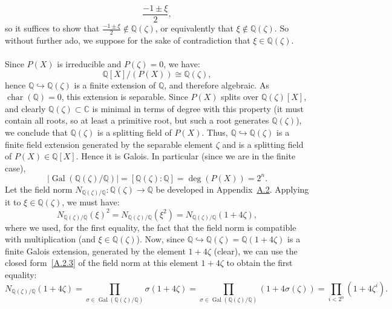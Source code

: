 \documentclass[11pt, a4paper, oneside]{article}
\theoremstyle{remark}
\theoremstyle{lemma}
\begin{document}
\[
\frac{-1 \pm \xi}{2},
\]
so it suffices to show that \( \frac{-1 \pm \xi}{2} \notin \mathbb{Q}(\zeta) \), or equivalently that \( \xi \notin \mathbb{Q}(\zeta) \). So without further ado, we suppose for the sake of contradiction that \( \xi \in \mathbb{Q}(\zeta) \).
\\\\
Since \( P(X) \) is irreducible and \( P(\zeta) = 0 \), we have:
\[
\mathbb{Q}[X] / \left( P(X) \right) \cong \mathbb{Q} \left( \zeta \right),
\]
hence \( \mathbb{Q} \hookrightarrow \mathbb{Q} \left( \zeta \right) \) is a finite extension of \( \mathbb{Q} \), and therefore algebraic. As \( \operatorname{char} \left( \mathbb{Q} \right) = 0 \), this extension is separable. Since \( P(X) \) splits over \( \mathbb{Q} \left( \zeta \right)[X] \), and clearly \( \mathbb{Q} \left( \zeta \right) \subset \mathbb{C} \) is minimal in terms of degree with this property (it must contain all roots, so at least a primitive root, but such a root generates \( \mathbb{Q} \left( \zeta \right) \)), we conclude that \( \mathbb{Q} \left( \zeta \right) \) is a splitting field of \( P(X) \). Thus, \( \mathbb{Q} \hookrightarrow \mathbb{Q} \left( \zeta \right) \) is a finite field extension generated by the separable element $\zeta$ and is a splitting field of \( P(X) \in \mathbb{Q}[X] \). Hence it is Galois. In particular (since we are in the finite case), 
\[
 \left| \operatorname{Gal} \left( \mathbb{Q}(\zeta)/\mathbb{Q} \right) \right|=[\mathbb{Q}(\zeta) : \mathbb{Q}] =\deg(P(X))=2^n.
\]
Let the field norm \( N_{\mathbb{Q}(\zeta)/\mathbb{Q}} : \mathbb{Q}(\zeta) \rightarrow \mathbb{Q} \) be developed in Appendix~\hyperref[A.2]{A.2}. Applying it to \( \xi \in \mathbb{Q}(\zeta) \), we must have:
\[
N_{\mathbb{Q}(\zeta)/\mathbb{Q}}(\xi)^2 = N_{\mathbb{Q}(\zeta)/\mathbb{Q}}\left( \xi^2 \right) = N_{\mathbb{Q}(\zeta)/\mathbb{Q}}(1 + 4\zeta),
\]
where we used, for the first equality, the fact that the field norm is compatible with multiplication (and \( \xi \in \mathbb{Q}(\zeta) \)). Now, since \( \mathbb{Q} \hookrightarrow \mathbb{Q}(\zeta) = \mathbb{Q}(1 + 4\zeta) \) is a finite Galois extension, generated by the element \( 1 + 4\zeta \) (clear), we can use the closed form~\eqref{A.2.3} of the field norm at this element \( 1 + 4\zeta \) to obtain the first equality:
\[
N_{\mathbb{Q}(\zeta)/\mathbb{Q}}(1 + 4\zeta)=\prod_{\sigma \in \operatorname{Gal}(\mathbb{Q}(\zeta)/\mathbb{Q})} \sigma(1 + 4\zeta) = \prod_{\sigma \in \operatorname{Gal}(\mathbb{Q}(\zeta)/\mathbb{Q})} \left( 1 + 4\sigma(\zeta) \right) = \prod_{i< 2^n} \left( 1 + 4\zeta^{i} \right).
\]
\end{document}
